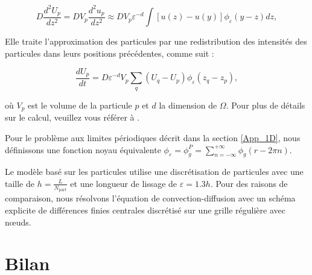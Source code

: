 \begin{equation*}
    D \frac{d^2 U_p}{dz^2} = D V_p \frac{d^2 u_p}{dz^2} \approx D V_p \varepsilon^{-d} \int [u(z) - u(y)] \phi_\varepsilon(y - z) dz,
\end{equation*}

Elle traite l'approximation des particules par une redistribution des intensités des particules dans leurs positions précédentes, comme suit :

\begin{equation*}
    \frac{dU_p}{dt} = D \varepsilon^{-d} V_p \sum_q (U_q - U_p) \phi_\varepsilon( z_q - z_p),
\end{equation*}

où $V_p$ est le volume de la particule $p$ et $d$ la dimension de $\Omega$.
Pour plus de détails sur le calcul, veuillez vous référer à \cite{cottet_1990}.

Pour le problème aux limites périodiques décrit dans la section \ref{App_1D}, nous définissons une fonction noyau équivalente $\phi_\varepsilon= \phi^P_g = \sum_{n=-\infty}^{+\infty} \phi_g(r - 2 \pi n )$.

Le modèle basé sur les particules utilise une discrétisation de \npart{} particules avec une taille de $h = \frac{L}{N_{\text{part}}}$ et une longueur de lissage de $\varepsilon = 1.3 h$.
Pour des raisons de comparaison, nous résolvons l'équation de convection-diffusion avec un schéma explicite de différences finies centrales discrétisé sur une grille régulière avec \ngrid{} nœuds.
\section{Bilan}